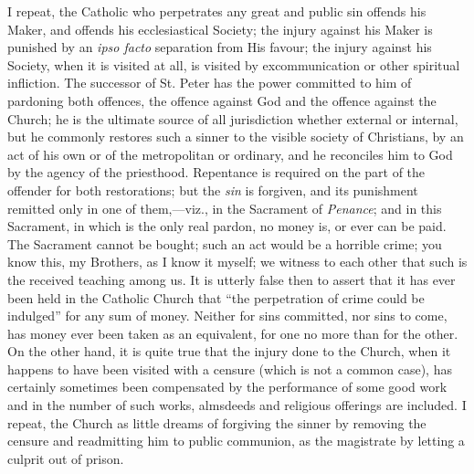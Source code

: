 I repeat, the Catholic who perpetrates any great and
public sin offends his Maker, and offends his
ecclesiastical Society; the injury against his Maker is
punished by an \emph{ipso facto} separation from His
favour; the injury against his Society, when it is
visited at all, is visited by excommunication or other
spiritual infliction. The successor of St. Peter has the
power committed to him of pardoning both offences, the
offence against God and the offence against the Church;
he is the ultimate source of all jurisdiction whether
external or internal, but he commonly restores such a
sinner to the visible society of Christians, by an act of
his own or of the metropolitan or ordinary, and he
reconciles him to God by the agency of the priesthood.
Repentance is required on the part of the offender for
both restorations; but the \emph{sin} is forgiven, and
its punishment remitted only in one of them,—viz.,
in the Sacrament of \emph{Penance}; and in this
Sacrament, in which is the only real pardon, no money is,
or ever can be paid. The Sacrament cannot be bought; such
an act would be a horrible crime; you know this, my
Brothers, as I know it myself; we witness to each other
that such is the received teaching among us. It is
utterly false then to assert that it has ever been held
in the Catholic Church that ``the perpetration of
crime could be indulged'' for any sum of money.
Neither for sins committed, nor sins to come, has money
ever been taken as an equivalent, for one no more than
for the other. On the other hand, it is quite true that
the injury done to the Church, when it happens to have
been visited with a censure (which is not a common case),
has certainly sometimes been compensated by the
performance of some good work and in the number of such
works, almsdeeds and religious offerings are included. I
repeat, the Church as little dreams of forgiving the
sinner by removing the censure and readmitting him to
public communion, as the magistrate by letting a culprit
out of prison.

